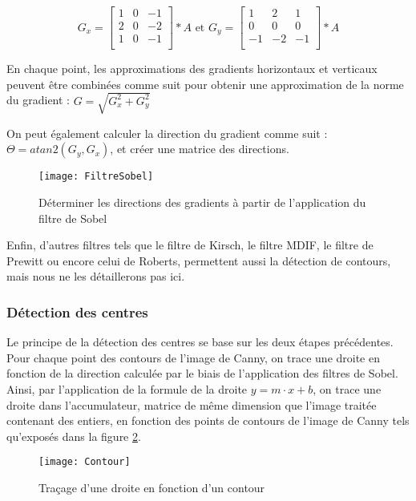 $$G_x = 
\begin{bmatrix}
	1 & 0 & -1 \\
	2 & 0 & -2 \\
	1 & 0 & -1 \\
\end{bmatrix}
* A \text{ et } G_y =
\begin{bmatrix}
	1 & 2 & 1 \\
	0 & 0 & 0 \\
	-1 & -2 & -1 \\
\end{bmatrix}
* A
$$

En chaque point, les approximations des gradients horizontaux et verticaux peuvent être combinées comme suit pour obtenir une approximation de la norme du gradient : $G = \sqrt{G_x^2 + G_y^2}$

On peut également calculer la direction du gradient comme suit : $\Theta = atan2(G_y, G_x)$, et créer une matrice des directions.

\begin{figure}[h]
  \centering
  \texttt{[image: FiltreSobel]}
  \caption{Déterminer les directions des gradients à partir de l’application du filtre de Sobel}
  \label{fig:FiltreSobel}
\end{figure}

Enfin, d’autres filtres tels que le filtre de Kirsch, le filtre MDIF, le filtre de Prewitt ou encore celui de Roberts, permettent aussi la détection de contours, mais nous ne les détaillerons pas ici.

\subsubsection{Détection des centres}

Le principe de la détection des centres se base sur les deux étapes précédentes. Pour chaque point des contours de l’image de Canny, on trace une droite en fonction de la direction calculée par le biais de l’application des filtres de Sobel. Ainsi, par l’application de la formule de la droite $y = m \cdot x + b$, on trace une droite dans l’accumulateur, matrice de même dimension que l'image traitée contenant des entiers, en fonction des points de contours de l’image de Canny tels qu’exposés dans la figure \ref{fig:Contour}.

\begin{figure}[h]
  \centering
  \texttt{[image: Contour]}
  \caption{Traçage d’une droite en fonction d’un contour}
  \label{fig:Contour}
\end{figure}

